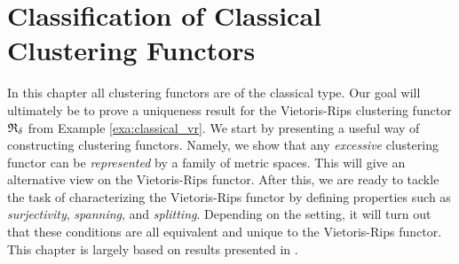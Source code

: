 \chapter{Classification of Classical Clustering Functors}
\label{chapter__classical}
In this chapter all clustering functors are of the classical type.
Our goal will ultimately be to prove a uniqueness result for the Vietoris-Rips clustering functor $\mathfrak{R}_\delta$ from Example \ref{exa:classical_vr}.
%
We start by presenting a useful way of constructing clustering functors. Namely, we show that any \emph{excessive} clustering functor can be \emph{represented} by a family of metric spaces. This will give an alternative view on the Vietoris-Rips functor.
%
After this, we are ready to tackle the task of characterizing the Vietoris-Rips functor by defining properties such as \emph{surjectivity}, \emph{spanning}, and \emph{splitting}. Depending on the setting, it will turn out that these conditions are all equivalent and unique to the Vietoris-Rips functor.
%
This chapter is largely based on results presented in \cite{Carlsson2010}.




